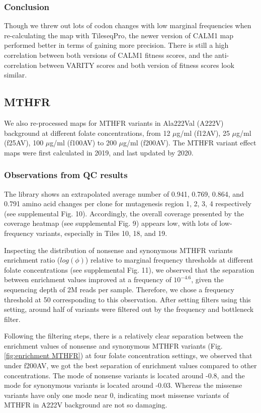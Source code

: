 \documentclass{article}
\begin{document}
\subsubsection{Conclusion}
Though we threw out lots of codon changes with low marginal frequencies when re-calculating the map with TileseqPro, the newer version of CALM1 map performed better in terms of gaining more precision. There is still a high correlation between both versions of CALM1 fitness scores, and the anti-correlation between VARITY scores and both version of fitness scores look similar.


\subsection{MTHFR}
We also re-processed maps for MTHFR variants in Ala222Val (A222V) background at different folate concentrations, from 12 $\mu$g/ml (f12AV), 25 $\mu$g/ml (f25AV), 100 $\mu$g/ml (f100AV) to 200 $\mu$g/ml (f200AV). The MTHFR variant effect maps\cite{weile_shifting_2021} were first calculated in 2019, and last updated by 2020.

\subsubsection{Observations from QC results}
The library shows an extrapolated average number of 0.941, 0.769, 0.864, and 0.791 amino acid changes per clone for mutagenesis region 1, 2, 3, 4 respectively (see supplemental Fig. 10). Accordingly, the overall coverage presented by the coverage heatmap (see supplemental Fig. 9) appears low, with lots of low-frequency variants, especially in Tiles 10, 18, and 19.

Inspecting the distribution of nonsense and synonymous MTHFR variants enrichment ratio ($log(\phi)$) relative to marginal frequency thresholds at different folate concentrations (see supplemental Fig. 11), we observed that the separation between enrichment values improved at a frequency of ${10}^{-4.6}$, given the sequencing depth of 2M reads per sample. Therefore, we chose a frequency threshold at 50 corresponding to this observation. After setting filters using this setting, around half of variants were filtered out by the frequency and bottleneck filter.

Following the filtering steps, there is a relatively clear separation between the enrichment values of nonsense and synonymous MTHFR variants (Fig. \ref{fig:enrichment MTHFR}) at four folate concentration settings, we observed that under f200AV, we got the best separation of enrichment values compared to other concentrations. The mode of nonsense variants is located around -0.8, and the mode for synonymous variants is located around -0.03. Whereas the missense variants have only one mode near 0, indicating most missense variants of MTHFR in A222V background are not so damaging.
\end{document}
